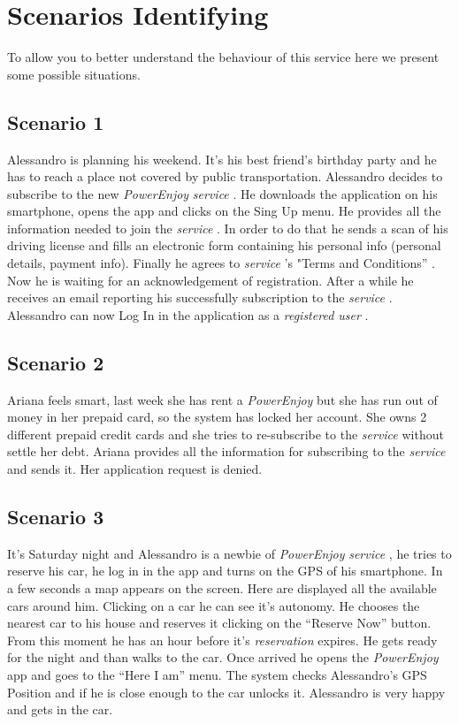 \documentclass[english]{article}
\newcommand{\powerenjoy}{\textit{PowerEnjoy }}
\newcommand{\registereduser}{\textit {registered user }}
\newcommand{\service}{\textit{service }}
\newcommand{\reservation}{\textit{reservation }}
\begin{document}
\section{Scenarios Identifying}
	To allow you to better understand the behaviour of this service here we present some possible situations.
	\subsection{Scenario 1}
		Alessandro is planning his weekend. It's his best friend's birthday party and he has to reach a place not covered by public transportation. Alessandro decides to subscribe to the new \powerenjoy \service. He downloads the application on his smartphone, opens the app and clicks on the Sing Up menu. He provides all the information needed to join the \service. In order to do that he sends a scan of his driving license and fills an electronic form containing his personal info (personal details, payment info). Finally he agrees to \service's	"Terms and Conditions'' .
		Now he is waiting for an acknowledgement of registration. After a while he receives an email reporting his successfully subscription to the \service. Alessandro can now Log In in the application as a \registereduser.
	\subsection{Scenario 2}
		Ariana feels smart, last week she has rent a \powerenjoy but she has run out of money in her prepaid card, so the system has locked her account. She owns 2 different prepaid credit cards and she tries to re-subscribe to the \service without settle her debt. Ariana provides all the information for subscribing to the \service and sends it. Her application request is denied.
	\subsection{Scenario 3}
		It's Saturday night and Alessandro is a newbie of \powerenjoy \service, he tries to reserve his car, he log in in the app and turns on the GPS of his smartphone. In a few seconds a map appears on the screen. Here are displayed all the available cars around him. Clicking on a car he can see it's autonomy. He chooses the nearest car to his house and reserves it clicking on the ``Reserve Now'' button. From this moment he has an hour before it's \reservation expires. He gets ready for the night and than walks to the car. Once arrived he opens the 	\powerenjoy app and goes to the ``Here I am'' menu. The system checks Alessandro's GPS Position and if he is close enough to the car unlocks it. Alessandro is very happy and gets in the car.
\end{document}

